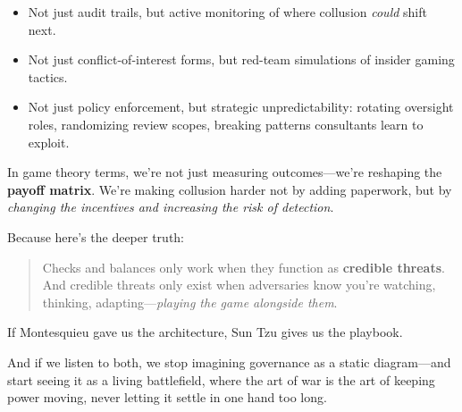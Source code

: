 \begin{itemize}
  \item Not just audit trails, but active monitoring of where collusion \textit{could} shift next.
  \item Not just conflict-of-interest forms, but red-team simulations of insider gaming tactics.
  \item Not just policy enforcement, but strategic unpredictability: rotating oversight roles, randomizing review scopes, breaking patterns consultants learn to exploit.
\end{itemize}

\medskip

In game theory terms, we’re not just measuring outcomes—we’re reshaping the \textbf{payoff matrix}. We’re making collusion harder not by adding paperwork, but by \textit{changing the incentives and increasing the risk of detection}.

\medskip

\noindent
Because here’s the deeper truth:

\begin{quote}
Checks and balances only work when they function as \textbf{credible threats}. And credible threats only exist when adversaries know you’re watching, thinking, adapting—\textit{playing the game alongside them}.
\end{quote}

\medskip

If Montesquieu gave us the architecture, Sun Tzu gives us the playbook.

And if we listen to both, we stop imagining governance as a static diagram—and start seeing it as a living battlefield, where the art of war is the art of keeping power moving, never letting it settle in one hand too long.

